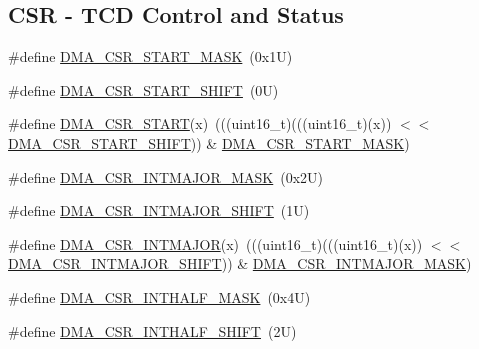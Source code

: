 \subsection*{C\+SR -\/ T\+CD Control and Status}
\begin{DoxyCompactItemize}
\item 
\#define \mbox{\hyperlink{group___d_m_a___register___masks_gac9356cdce4f3a2f7986ce84cbb0cd31f}{D\+M\+A\+\_\+\+C\+S\+R\+\_\+\+S\+T\+A\+R\+T\+\_\+\+M\+A\+SK}}~(0x1\+U)
\item 
\#define \mbox{\hyperlink{group___d_m_a___register___masks_ga195c81979f073c246c7cfd65eb5beeba}{D\+M\+A\+\_\+\+C\+S\+R\+\_\+\+S\+T\+A\+R\+T\+\_\+\+S\+H\+I\+FT}}~(0\+U)
\item 
\#define \mbox{\hyperlink{group___d_m_a___register___masks_gadf8b3046d6c4f6a4577bd841c287a058}{D\+M\+A\+\_\+\+C\+S\+R\+\_\+\+S\+T\+A\+RT}}(x)~(((uint16\+\_\+t)(((uint16\+\_\+t)(x)) $<$$<$ \mbox{\hyperlink{group___d_m_a___register___masks_ga195c81979f073c246c7cfd65eb5beeba}{D\+M\+A\+\_\+\+C\+S\+R\+\_\+\+S\+T\+A\+R\+T\+\_\+\+S\+H\+I\+FT}})) \& \mbox{\hyperlink{group___d_m_a___register___masks_gac9356cdce4f3a2f7986ce84cbb0cd31f}{D\+M\+A\+\_\+\+C\+S\+R\+\_\+\+S\+T\+A\+R\+T\+\_\+\+M\+A\+SK}})
\item 
\#define \mbox{\hyperlink{group___d_m_a___register___masks_ga8d41b8ec510ae91e64c21d13721a272d}{D\+M\+A\+\_\+\+C\+S\+R\+\_\+\+I\+N\+T\+M\+A\+J\+O\+R\+\_\+\+M\+A\+SK}}~(0x2\+U)
\item 
\#define \mbox{\hyperlink{group___d_m_a___register___masks_ga3e62ac93fd0c7b4f8a78612dc83d67a4}{D\+M\+A\+\_\+\+C\+S\+R\+\_\+\+I\+N\+T\+M\+A\+J\+O\+R\+\_\+\+S\+H\+I\+FT}}~(1\+U)
\item 
\#define \mbox{\hyperlink{group___d_m_a___register___masks_ga19f9948f07166ffacc6c4eca2aa16368}{D\+M\+A\+\_\+\+C\+S\+R\+\_\+\+I\+N\+T\+M\+A\+J\+OR}}(x)~(((uint16\+\_\+t)(((uint16\+\_\+t)(x)) $<$$<$ \mbox{\hyperlink{group___d_m_a___register___masks_ga3e62ac93fd0c7b4f8a78612dc83d67a4}{D\+M\+A\+\_\+\+C\+S\+R\+\_\+\+I\+N\+T\+M\+A\+J\+O\+R\+\_\+\+S\+H\+I\+FT}})) \& \mbox{\hyperlink{group___d_m_a___register___masks_ga8d41b8ec510ae91e64c21d13721a272d}{D\+M\+A\+\_\+\+C\+S\+R\+\_\+\+I\+N\+T\+M\+A\+J\+O\+R\+\_\+\+M\+A\+SK}})
\item 
\#define \mbox{\hyperlink{group___d_m_a___register___masks_ga65d795eca7173289b56fc862abbf6703}{D\+M\+A\+\_\+\+C\+S\+R\+\_\+\+I\+N\+T\+H\+A\+L\+F\+\_\+\+M\+A\+SK}}~(0x4\+U)
\item 
\#define \mbox{\hyperlink{group___d_m_a___register___masks_ga72ab8889d41c8ab88cea74dcb81d0f00}{D\+M\+A\+\_\+\+C\+S\+R\+\_\+\+I\+N\+T\+H\+A\+L\+F\+\_\+\+S\+H\+I\+FT}}~(2\+U)

\end{DoxyCompactItemize}
